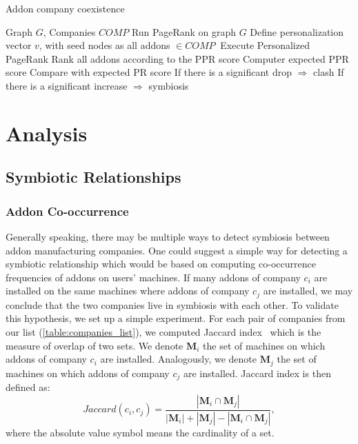 \documentclass[11pt,oneside]{book}
\let\Oldsection\section
\renewcommand{\section}{\FloatBarrier\Oldsection}
\let\Oldsubsection\subsection
\renewcommand{\subsection}{\FloatBarrier\Oldsubsection}
\let\Oldsubsubsection\subsubsection
\renewcommand{\subsubsection}{\FloatBarrier\Oldsubsubsection}
\begin{document}
\begin{algorithm}[!t]
\caption{Addon company coexistence}
\label{alg:collect_addon_data}
\begin{algorithmic}[1] 
\REQUIRE Graph $G$, Companies $COMP$
\STATE Run PageRank on graph $G$
\STATE Define personalization vector $v$, with seed nodes as all addons $\in COMP\ $
\STATE Execute Personalized PageRank
\STATE Rank all addons according to the PPR score
\STATE Computer expected PPR score 
\STATE Compare with expected PR score
\STATE If there is a significant drop $\Rightarrow$ clash
\STATE If there is a significant increase $\Rightarrow$ symbiosis
\ENDFOR
\ENDFOR
\end{algorithmic}
\end{algorithm}

\section{Analysis}
\subsection{Symbiotic Relationships}
\label{sec:symb_relations}

\subsubsection{Addon Co-occurrence}
\label{subsub:co_occurrence}

Generally speaking, there may be multiple ways to detect symbiosis between addon manufacturing companies. One could suggest a simple way for detecting a symbiotic relationship which would be based on computing co-occurrence frequencies of addons on users' machines. If many addons of company $c_i$ are installed on the same machines where addons of company $c_j$ are installed, we may conclude that the two companies live in symbiosis with each other. To validate this hypothesis, we set up a simple experiment. For each pair of companies from our list (\autoref{table:companies_list}), we computed Jaccard index~\citep{jaccard1912distribution} which is the measure of overlap of two sets. We denote $\mathbf{M}_i$ the set of machines on which addons of company $c_i$ are installed. Analogously, we denote $\mathbf{M}_j$ the set of machines on which addons of company $c_j$ are installed. Jaccard index is then defined as:
$$
Jaccard(c_i, c_j) = \frac{|\mathbf{M}_i \cap \mathbf{M}_j|}{|\mathbf{M}_i| + |\mathbf{M}_j| - |\mathbf{M}_i \cap \mathbf{M}_j|},
$$
where the absolute value symbol means the cardinality of a set.
\end{document}
